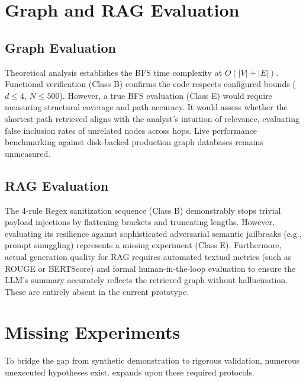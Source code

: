 \section{Graph and RAG Evaluation}
\label{sec:eval-graph-rag}
\subsection{Graph Evaluation}
Theoretical analysis establishes the BFS time complexity at $O(|V| + |E|)$. Functional verification (Class B) confirms the code respects configured bounds ($d \le 4$, $N \le 500$). 
However, a true BFS evaluation (Class E) would require measuring structural coverage and path accuracy. It would assess whether the shortest path retrieved aligns with the analyst's intuition of relevance, evaluating false inclusion rates of unrelated nodes across hops. Live performance benchmarking against disk-backed production graph databases remains unmeasured.

\subsection{RAG Evaluation}
The 4-rule Regex sanitization sequence (Class B) demonstrably stops trivial payload injections by flattening brackets and truncating lengths. However, evaluating its resilience against sophisticated adversarial semantic jailbreaks (e.g., prompt smuggling) represents a missing experiment (Class E). 
Furthermore, actual generation quality for RAG requires automated textual metrics (such as ROUGE or BERTScore) and formal human-in-the-loop evaluation to ensure the LLM's summary accurately reflects the retrieved graph without hallucination. These are entirely absent in the current prototype.

\section{Missing Experiments}
\label{sec:eval-missing}
To bridge the gap from synthetic demonstration to rigorous validation, numerous unexecuted hypotheses exist.  expands upon these required protocols.

